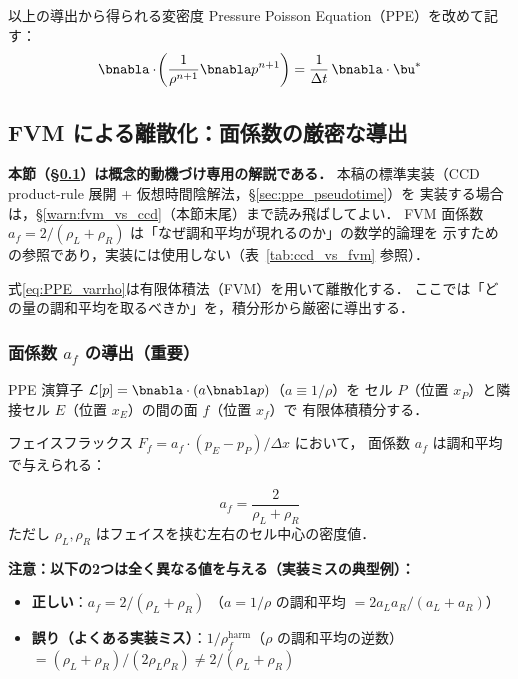 以上の導出から得られる変密度 Pressure Poisson Equation（PPE）を改めて記す：
\begin{equation}
  \bnabla\cdot\!\left( \frac{1}{\rho^{n+1}} \bnabla p^{n+1} \right) = \frac{1}{\Delta t}\, \bnabla\cdot \bu^{\ast}
  \label{eq:PPE_varrho}
\end{equation}

\subsection{FVM による離散化：面係数の厳密な導出}
\label{sec:fvm_face_coeff}

\begin{tcolorbox}[warnbox]
\textbf{本節（§\ref{sec:fvm_face_coeff}）は概念的動機づけ専用の解説である．}
本稿の標準実装（CCD product-rule 展開 + 仮想時間陰解法，§\ref{sec:ppe_pseudotime}）を
実装する場合は，§\ref{warn:fvm_vs_ccd}（本節末尾）まで読み飛ばしてよい．
FVM 面係数 $a_f = 2/(\rho_L+\rho_R)$ は「なぜ調和平均が現れるのか」の数学的論理を
示すための参照であり，実装には使用しない（表~\ref{tab:ccd_vs_fvm} 参照）．
\end{tcolorbox}

式\eqref{eq:PPE_varrho}は有限体積法（FVM）を用いて離散化する．
ここでは「どの量の調和平均を取るべきか」を，積分形から厳密に導出する．

\subsubsection{面係数 $a_f$ の導出（重要）}

PPE 演算子 $\mathcal{L}[p] = \bnabla\cdot(a\bnabla p)$（$a \equiv 1/\rho$）を
セル $P$（位置 $x_P$）と隣接セル $E$（位置 $x_E$）の間の面 $f$（位置 $x_f$）で
有限体積積分する．

フェイスフラックス $F_f = a_f \cdot (p_E - p_P)/\Delta x$ において，
面係数 $a_f$ は調和平均で与えられる：

\begin{tcolorbox}[mybox, title={PPE 面係数 $a_f$ の厳密な式（実装で使うべき式）}]
\begin{equation}
  \boxed{
  a_f = \frac{2}{\rho_L + \rho_R}
  }
  \label{eq:af_exact}
\end{equation}
ただし $\rho_L, \rho_R$ はフェイスを挟む左右のセル中心の密度値．

\textbf{注意：以下の2つは全く異なる値を与える（実装ミスの典型例）：}
\begin{itemize}
  \item \textbf{正しい}：$a_f = 2/(\rho_L + \rho_R)$
        \quad（$a=1/\rho$ の調和平均 $= 2a_La_R/(a_L+a_R)$）
  \item \textbf{誤り（よくある実装ミス）}：$1/\rho_f^{\text{harm}}$（$\rho$ の調和平均の逆数）
        $= (\rho_L+\rho_R)/(2\rho_L\rho_R) \neq 2/(\rho_L+\rho_R)$
\end{itemize}
\end{tcolorbox}

